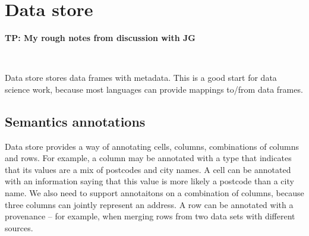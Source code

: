 \documentclass[sigplan,preprint,10pt]{acmart}\settopmatter{printfolios=true,printccs=false,printacmref=false}
\theoremstyle{plain}
\theoremstyle{definition}
\begin{document}

\section{Data store}
\label{sec:datastore}

{\color{red}
\textbf{TP: My rough notes from discussion with JG}

~

\noindent
Data store stores data frames with metadata. This is a good start for data science work,
because most languages can provide mappings to/from data frames.
}

\subsection{Semantics annotations}
{\color{red}
Data store provides a way of annotating cells, columns, combinations of columns and rows.
For example, a column may be annotated with a type that indicates that its values are a mix of
postcodes and city names. A cell can be annotated with an information saying that this value is 
more likely a postcode than a city name. We also need to support annotaitons on a combination of
columns, because three columns can jointly represent an address. A row can be annotated with a 
provenance -- for example, when merging rows from two data sets with different sources.
}
\end{document}
